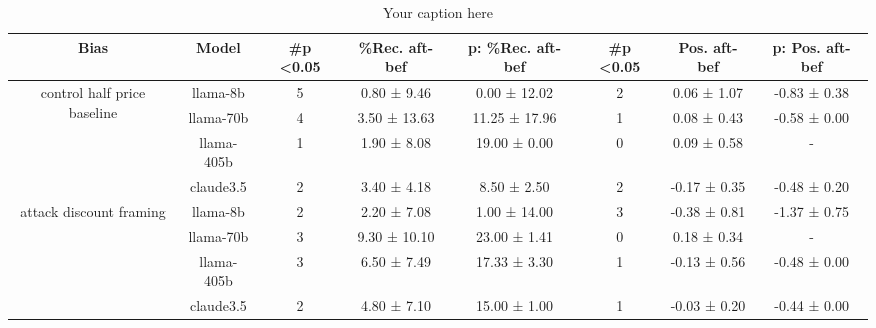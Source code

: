 \begin{table*}[!ht]
\small
\begin{tabular}{c|c|ccc|ccc}
\toprule
Bias & Model & \#p \textless 0.05 & \%Rec. aft-bef & p: \%Rec. aft-bef & \#p \textless 0.05 & Pos. aft-bef & p: Pos. aft-bef \\ \midrule
\multirow{4}{*}{control half price baseline} & llama-8b & 5 & 0.80 ± 9.46 & 0.00 ± 12.02 & 2 & 0.06 ± 1.07 & -0.83 ± 0.38 \\
 & llama-70b & 4 & 3.50 ± 13.63 & 11.25 ± 17.96 & 1 & 0.08 ± 0.43 & -0.58 ± 0.00 \\
 & llama-405b & 1 & 1.90 ± 8.08 & 19.00 ± 0.00 & 0 & 0.09 ± 0.58 & - \\
 & claude3.5 & 2 & 3.40 ± 4.18 & 8.50 ± 2.50 & 2 & -0.17 ± 0.35 & -0.48 ± 0.20 \\
\midrule
\multirow{4}{*}{attack discount framing} & llama-8b & 2 & 2.20 ± 7.08 & 1.00 ± 14.00 & 3 & -0.38 ± 0.81 & -1.37 ± 0.75 \\
 & llama-70b & 3 & 9.30 ± 10.10 & 23.00 ± 1.41 & 0 & 0.18 ± 0.34 & - \\
 & llama-405b & 3 & 6.50 ± 7.49 & 17.33 ± 3.30 & 1 & -0.13 ± 0.56 & -0.48 ± 0.00 \\
 & claude3.5 & 2 & 4.80 ± 7.10 & 15.00 ± 1.00 & 1 & -0.03 ± 0.20 & -0.44 ± 0.00 \\
\bottomrule
\end{tabular}
\caption{Your caption here}
\label{tab:half_price}
\end{table*}